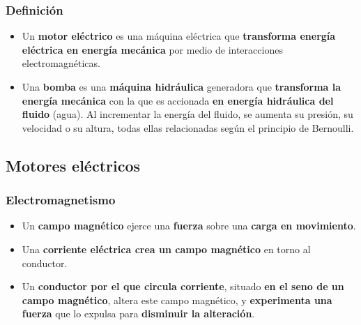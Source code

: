 \documentclass[serif, xcolor=dvipsnames]{beamer}
\begin{document}
\begin{frame}
\frametitle{Definición}
\begin{itemize}
\item Un \textbf{motor eléctrico} es una máquina eléctrica que \textbf{transforma
energía eléctrica en energía mecánica} por medio de interacciones
electromagnéticas.
\item Una \textbf{bomba} es una \textbf{máquina hidráulica} generadora que\textbf{
transforma la energía mecánica} con la que es accionada \textbf{en
energía hidráulica del fluido} (agua). Al incrementar la energía del
fluido, se aumenta su presión, su velocidad o su altura, todas ellas
relacionadas según el principio de Bernoulli.
\end{itemize}

\end{frame}

\subsection{Motores eléctricos}


\begin{frame}
\frametitle{Electromagnetismo}
\begin{itemize}
\item Un \textbf{campo magnético} ejerce una \textbf{fuerza} sobre una \textbf{carga
en movimiento}.
\item Una \textbf{corriente eléctrica crea un campo magnético} en torno
al conductor.
\item Un \textbf{conductor por el que circula corriente}, situado \textbf{en
el seno de un campo magnético}, altera este campo magnético, y \textbf{experimenta
una fuerza} que lo expulsa para \textbf{disminuir la alteración}.
\end{itemize}

\end{frame}
\end{document}
